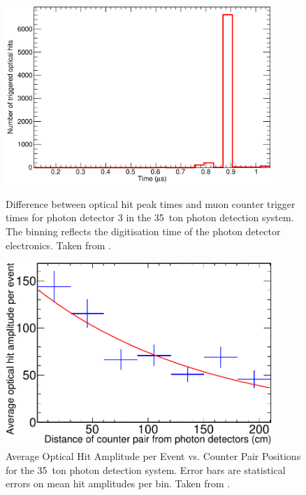 \begin{figure}

  \begin{minipage}[t]{0.48\linewidth}
    \centering
    \includegraphics[width=0.9\textwidth]{35tonPhotonDetectorsResolution.pdf}
    \caption[Difference between optical hit peak times and muon counter trigger times for photon detector 3 in the 35~ton photon detection system.]{Difference between optical hit peak times and muon counter trigger times for photon detector 3 in the 35~ton photon detection system. The binning reflects the digitisation time of the photon detector electronics.  Taken from \cite{35tonPhotonDetectors}.}
    \label{fig:35tonPhotonDetectorsResolution}
  \end{minipage}
  \hfill
  \begin{minipage}[t]{0.48\linewidth}
    \centering
    \includegraphics[width=0.9\textwidth]{35tonPhotonDetectorsAttenuation.pdf}
    \caption[Average Optical Hit Amplitude per Event vs. Counter Pair Positions for the 35~ton photon detection system.]{Average Optical Hit Amplitude per Event vs. Counter Pair Positions for the 35~ton photon detection system.  Error bars are statistical errors on mean hit amplitudes per bin.  Taken from \cite{35tonPhotonDetectors}.}
    \label{fig:35tonPhotonDetectorsAttenuation}
  \end{minipage}

\end{figure}


